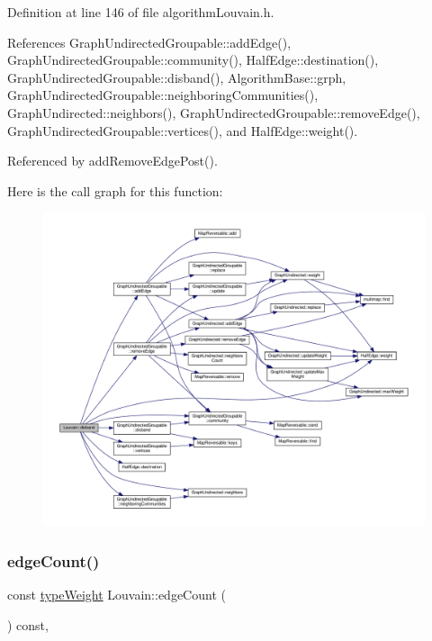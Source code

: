 Definition at line 146 of file algorithm\+Louvain.\+h.



References Graph\+Undirected\+Groupable\+::add\+Edge(), Graph\+Undirected\+Groupable\+::community(), Half\+Edge\+::destination(), Graph\+Undirected\+Groupable\+::disband(), Algorithm\+Base\+::grph, Graph\+Undirected\+Groupable\+::neighboring\+Communities(), Graph\+Undirected\+::neighbors(), Graph\+Undirected\+Groupable\+::remove\+Edge(), Graph\+Undirected\+Groupable\+::vertices(), and Half\+Edge\+::weight().



Referenced by add\+Remove\+Edge\+Post().

Here is the call graph for this function\+:
\nopagebreak
\begin{figure}[H]
\begin{center}
\leavevmode
\includegraphics[width=350pt]{classLouvain_a0f6163e6efef09a9c1efd8b9b17f5880_cgraph}
\end{center}
\end{figure}
\mbox{\label{classLouvain_a679f4a903e8d2199ab9ec206b999ce0a}} 
\subsubsection{\texorpdfstring{edge\+Count()}{edgeCount()}}
{\footnotesize\ttfamily const \hyperlink{edge_8h_a2e7ea3be891ac8b52f749ec73fee6dd2}{type\+Weight} Louvain\+::edge\+Count (\begin{DoxyParamCaption}{ }\end{DoxyParamCaption}) const\hspace{0.3cm}{\ttfamily [inline]}, {\ttfamily [private]}}



